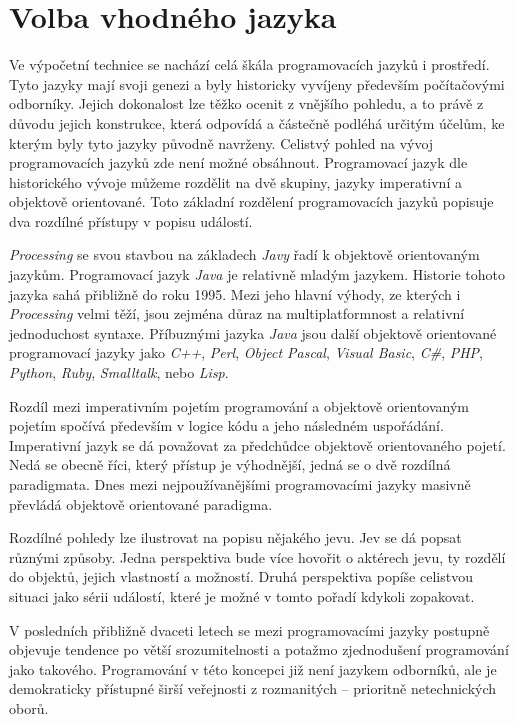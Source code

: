 \documentclass[10pt,twoside=true,open=right,cleardoublepage=empty,chapterprefix=true]{scrbook}
\newcommand{\oddil}[1]{\section{#1}\index{#1}\label{#1}}
\newcommand{\lnb}{\linebreak}
\begin{document}
\oddil{Volba vhodného jazyka}

Ve výpočetní technice se nachází celá škála programovacích jazyků i prostředí. Tyto jazyky mají svoji genezi a byly historicky vyvíjeny především počítačovými odborníky. Jejich dokonalost lze těžko ocenit z vnějšího pohledu, a to právě z důvodu jejich konstrukce, která odpovídá a částečně podléhá určitým účelům, ke kterým byly tyto jazyky původně navrženy. Celistvý pohled na vývoj programovacích jazyků zde není možné obsáhnout. Programovací jazyk dle historického vývoje můžeme rozdělit na dvě skupiny, jazyky imperativní a objektově orientované. Toto základní rozdělení programovacích jazyků popisuje dva rozdílné přístupy v popisu událostí. 

{\em Processing} se svou stavbou na základech {\em Javy} řadí k objektově \lnb orientovaným jazykům. Programovací jazyk {\em Java} je relativně mladým jazykem. Historie tohoto jazyka sahá přibližně do roku 1995. Mezi jeho hlavní výhody, ze kterých i {\em Processing} velmi těží, jsou zejména důraz na multiplatformnost a relativní jednoduchost syntaxe. Příbuznými jazyka {\em Java} jsou další objektově orientované programovací jazyky jako {\em  C++}, {\em  Perl}, {\em Object Pascal}, {\em Visual Basic}, {\em C\#}, {\em PHP}, {\em Python}, {\em Ruby}, {\em Smalltalk}, nebo {\em Lisp}. 

Rozdíl mezi imperativním pojetím programování a objektově orientovaným pojetím spočívá především v logice kódu a jeho následném uspořádání. Imperativní jazyk se dá považovat za předchůdce objektově orientovaného pojetí. Nedá se obecně říci, který přístup je výhodnější, jedná se \lnb o dvě rozdílná paradigmata. Dnes mezi nejpoužívanějšími programovacími jazyky masivně převládá objektově orientované paradigma.

Rozdílné pohledy lze ilustrovat na popisu nějakého jevu. Jev se dá popsat různými způsoby. Jedna perspektiva bude více hovořit o aktérech jevu, ty rozdělí do objektů, jejich vlastností a možností. Druhá perspektiva popíše celistvou situaci jako sérii událostí, které je možné v tomto pořadí kdykoli zopakovat.


V posledních přibližně dvaceti letech se mezi programovacími jazyky postupně objevuje tendence po větší srozumitelnosti a potažmo zjednodušení programování jako takového. Programování v této koncepci již není jazykem odborníků, ale je demokraticky přístupné širší veřejnosti z rozmanitých -- prioritně netechnických oborů. 
\end{document}
